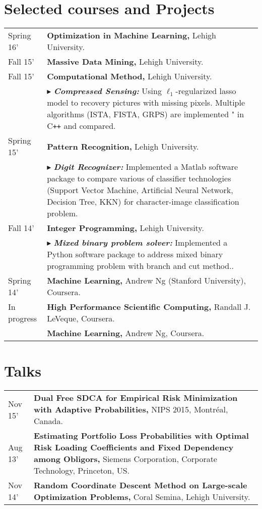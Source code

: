 \documentclass[a4paper,11pt]{article} %
\newcommand{\lst}[1]{\quad\footnotesize{$\blacktriangleright$ #1.}}
\begin{document}
\section{Selected courses and Projects}
\begin{longtable}{>{\centering}p{3.3cm}|p{14cm}}
    Spring 16'& \textbf{Optimization in Machine Learning,} Lehigh University.\\ 
    Fall 15'& \textbf{Massive Data Mining,} Lehigh University.\\ 
    Fall 15'& \textbf{Computational Method,} Lehigh University.\\ 
    &\lst{\textbf{\emph{Compressed Sensing:}} Using $\ell_1$-regularized lasso model to recovery pictures with missing pixels. Multiple algorithms (ISTA, FISTA, GRPS) are implemented " in C\texttt{++} and compared}\\   
    Spring 15'& \textbf{Pattern Recognition,} Lehigh University.\\ 
    & \lst{\textbf{\emph{Digit Recognizer:}} Implemented a Matlab software package to compare various of classifier technologies (Support Vector Machine, Artificial Neural Network, Decision Tree, KKN) for character-image classification problem}\\
    Fall 14'& \textbf{Integer Programming,} Lehigh University.\\ 
    &\lst{\textbf{\emph{Mixed binary problem solver:}} Implemented a Python software package to address mixed binary programming problem with branch and cut method.}\\
    Spring 14'& \textbf{Machine Learning,} Andrew Ng (Stanford University), Coursera.\\
    In progress&\textbf{High Performance Scientific Computing,} Randall J. LeVeque, Coursera.\\
    &\textbf{Machine Learning,} Andrew Ng, Coursera.
\end{longtable}

\section{Talks}
\begin{longtable}{>{\centering}p{3.3cm}|p{14cm}}
    Nov 15' &\textbf{Dual Free SDCA for Empirical Risk Minimization with Adaptive Probabilities,} NIPS 2015, Montréal, Canada.  \\
    Aug 13' &\textbf{Estimating Portfolio Loss Probabilities with Optimal Risk Loading Coefficients and Fixed Dependency among Obligors,} Siemens Corporation, Corporate Technology, Princeton, US.\\
    Nov 14' &\textbf{Random Coordinate Descent Method on Large-scale Optimization Problems,} Coral Semina, Lehigh University.
\end{longtable}
\end{document}
